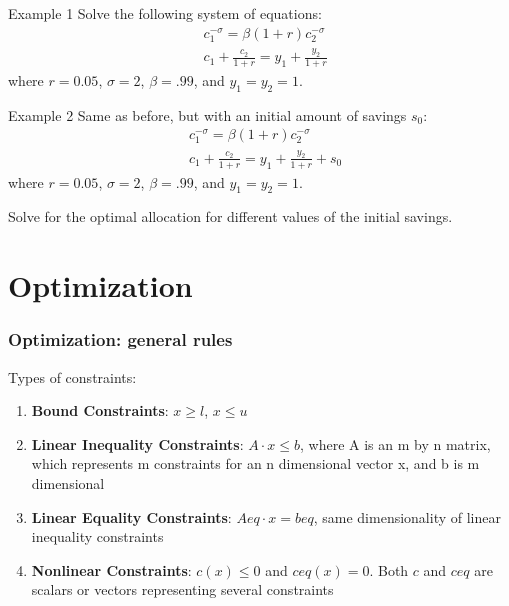 \documentclass[show notes]{beamer}%
\begin{document}
\begin{frame}[fragile]{Example 1}
Solve the following system of equations:
\begin{align*}
& c_1^{-\sigma} = \beta (1+r) c_2^{-\sigma} \\
& c_1 + \frac{c_2}{1+r} = y_1 + \frac{y_2}{1+r} 
\end{align*}
where $r=0.05$, $\sigma = 2$, $\beta = .99$, and $y_1 = y_2 = 1$.
\end{frame}


\begin{frame}[fragile]{Example 2}
Same as before, but with an initial amount of savings $s_0$:
\begin{align*}
& c_1^{-\sigma} = \beta (1+r) c_2^{-\sigma} \\
& c_1 + \frac{c_2}{1+r} = y_1 + \frac{y_2}{1+r} + s_0
\end{align*}
where $r=0.05$, $\sigma = 2$, $\beta = .99$, and $y_1 = y_2 = 1$.

Solve for the optimal allocation for different values of the initial savings. 
\end{frame}


\section{Optimization}


\begin{frame}[fragile]
\frametitle{Optimization: general rules}

Types of constraints:  \pause

\begin{enumerate}

\item \textbf{Bound Constraints}: $x \geq l$, $x \leq u$ \pause

\item \textbf{Linear Inequality Constraints}: $A \cdot x \leq  b$, where A is an m by n matrix, which represents m constraints for an n dimensional vector x, and b is m dimensional \pause

\item \textbf{Linear Equality Constraints}: $Aeq \cdot x = beq$, same dimensionality of linear inequality constraints \pause

\item \textbf{Nonlinear Constraints}: $c\left(x \right) \leq 0$ and $ceq\left(x\right) = 0$. Both $c$ and $ceq$ are scalars or vectors representing several constraints

\end{enumerate}

\end{frame}
\end{document}
